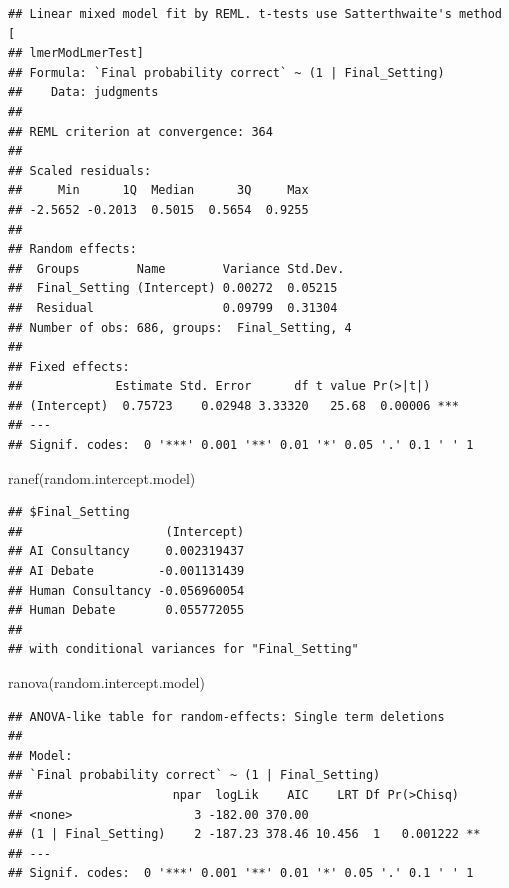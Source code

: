 \documentclass[
]{article}
\newenvironment{Shaded}{\begin{snugshade}}{\end{snugshade}}
\newcommand{\FunctionTok}[1]{\textcolor[rgb]{0.00,0.00,0.00}{#1}}
\newcommand{\NormalTok}[1]{#1}
\begin{document}
\begin{verbatim}
## Linear mixed model fit by REML. t-tests use Satterthwaite's method [
## lmerModLmerTest]
## Formula: `Final probability correct` ~ (1 | Final_Setting)
##    Data: judgments
## 
## REML criterion at convergence: 364
## 
## Scaled residuals: 
##     Min      1Q  Median      3Q     Max 
## -2.5652 -0.2013  0.5015  0.5654  0.9255 
## 
## Random effects:
##  Groups        Name        Variance Std.Dev.
##  Final_Setting (Intercept) 0.00272  0.05215 
##  Residual                  0.09799  0.31304 
## Number of obs: 686, groups:  Final_Setting, 4
## 
## Fixed effects:
##             Estimate Std. Error      df t value Pr(>|t|)    
## (Intercept)  0.75723    0.02948 3.33320   25.68  0.00006 ***
## ---
## Signif. codes:  0 '***' 0.001 '**' 0.01 '*' 0.05 '.' 0.1 ' ' 1
\end{verbatim}

\begin{Shaded}
\begin{Highlighting}[]
\FunctionTok{ranef}\NormalTok{(random.intercept.model)}
\end{Highlighting}
\end{Shaded}

\begin{verbatim}
## $Final_Setting
##                    (Intercept)
## AI Consultancy     0.002319437
## AI Debate         -0.001131439
## Human Consultancy -0.056960054
## Human Debate       0.055772055
## 
## with conditional variances for "Final_Setting"
\end{verbatim}

\begin{Shaded}
\begin{Highlighting}[]
\FunctionTok{ranova}\NormalTok{(random.intercept.model)}
\end{Highlighting}
\end{Shaded}

\begin{verbatim}
## ANOVA-like table for random-effects: Single term deletions
## 
## Model:
## `Final probability correct` ~ (1 | Final_Setting)
##                     npar  logLik    AIC    LRT Df Pr(>Chisq)   
## <none>                 3 -182.00 370.00                        
## (1 | Final_Setting)    2 -187.23 378.46 10.456  1   0.001222 **
## ---
## Signif. codes:  0 '***' 0.001 '**' 0.01 '*' 0.05 '.' 0.1 ' ' 1
\end{verbatim}
\end{document}
